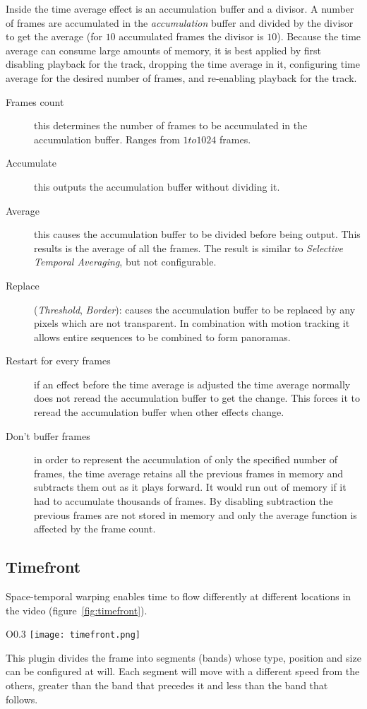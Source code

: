 Inside the time average effect is an accumulation buffer and a divisor. A number of frames are accumulated in the \textit{accumulation} buffer and divided by the divisor to get the average (for $10$ accumulated frames the divisor is $10$). Because the time average can consume large amounts of memory, it is best applied by first disabling playback for the track, dropping the time average in it, configuring time average for the desired number of frames, and re-enabling playback for the track.

\begin{description}
    \item[Frames count] this determines the number of frames to be accumulated in the accumulation buffer. Ranges from $1 to 1024$ frames.
    \item[Accumulate] this outputs the accumulation buffer without dividing it.
    \item[Average] this causes the accumulation buffer to be divided before being output. This results is the average of all the frames. The result is similar to \textit{Selective Temporal Averaging}, but not configurable.
    \item[Replace] (\textit{Threshold}, \textit{Border}): causes the accumulation buffer to be replaced by any pixels which are not transparent. In combination with motion tracking it allows entire sequences to be combined to form panoramas.
    \item[Restart for every frames] if an effect before the time average is adjusted the time average normally does not reread the accumulation buffer to get the change. This forces it to reread the accumulation buffer when other effects change.
    \item[Don’t buffer frames] in order to represent the accumulation of only the specified number of frames, the time average retains all the previous frames in memory and subtracts them out as it plays forward. It would run out of memory if it had to accumulate thousands of frames. By disabling subtraction the previous frames are not stored in memory and only the average function is affected by the frame count.
\end{description}

\subsection{Timefront}%
\label{sub:timefront}

Space-temporal warping enables time to flow differently at different locations in the video (figure~\ref{fig:timefront}).
\begin{wrapfigure}[13]{O}{0.3\linewidth}
    \vspace{-2ex}
    \texttt{[image: timefront.png]}
    \caption{Temporal bands for Timefront}
    \label{fig:timefront}
\end{wrapfigure}
This plugin divides the frame into segments (bands) whose type, position and size can be configured at will. Each segment will move with a different speed from the others, greater than the band that precedes it and less than the band that follows.

